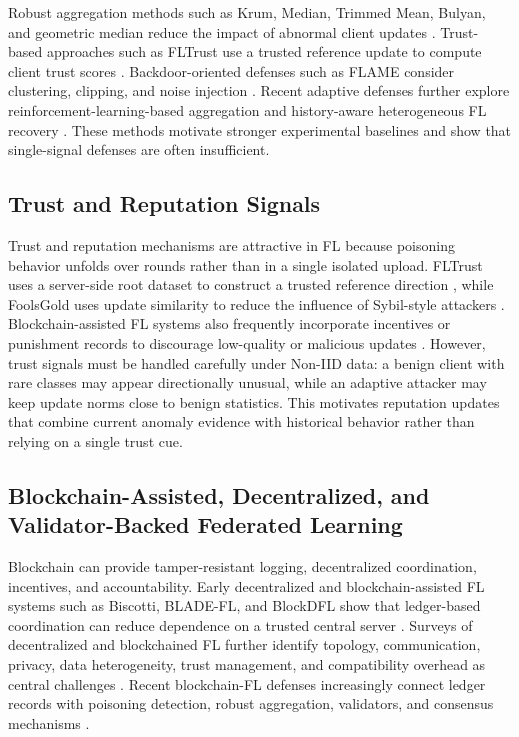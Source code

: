 \documentclass[preprint,authoryear,12pt]{elsarticle}
\begin{document}
Robust aggregation methods such as Krum, Median, Trimmed Mean, Bulyan, and geometric median reduce the impact of abnormal client updates \citep{blanchard2017krum,yin2018byzantine,elmhamdi2018bulyan,pillutla2022rfa}. Trust-based approaches such as FLTrust use a trusted reference update to compute client trust scores \citep{cao2021fltrust}. Backdoor-oriented defenses such as FLAME consider clustering, clipping, and noise injection \citep{nguyen2022flame}. Recent adaptive defenses further explore reinforcement-learning-based aggregation and history-aware heterogeneous FL recovery \citep{wang2025adaaggrl,wang2025fedhan}. These methods motivate stronger experimental baselines and show that single-signal defenses are often insufficient.

\subsection{Trust and Reputation Signals}

Trust and reputation mechanisms are attractive in FL because poisoning behavior unfolds over rounds rather than in a single isolated upload. FLTrust uses a server-side root dataset to construct a trusted reference direction \citep{cao2021fltrust}, while FoolsGold uses update similarity to reduce the influence of Sybil-style attackers \citep{fung2020foolsgold}. Blockchain-assisted FL systems also frequently incorporate incentives or punishment records to discourage low-quality or malicious updates \citep{lu2020blockchain,zhang2024bitfl,ren2024bpfl}. However, trust signals must be handled carefully under Non-IID data: a benign client with rare classes may appear directionally unusual, while an adaptive attacker may keep update norms close to benign statistics. This motivates reputation updates that combine current anomaly evidence with historical behavior rather than relying on a single trust cue.

\subsection{Blockchain-Assisted, Decentralized, and Validator-Backed Federated Learning}

Blockchain can provide tamper-resistant logging, decentralized coordination, incentives, and accountability. Early decentralized and blockchain-assisted FL systems such as Biscotti, BLADE-FL, and BlockDFL show that ledger-based coordination can reduce dependence on a trusted central server \citep{shayan2018biscotti,li2021bladefl,qin2022blockdfl}. Surveys of decentralized and blockchained FL further identify topology, communication, privacy, data heterogeneity, trust management, and compatibility overhead as central challenges \citep{yuan2024dflsurvey,jiang2023blockflsurvey,hallaji2024dflsecurity}. Recent blockchain-FL defenses increasingly connect ledger records with poisoning detection, robust aggregation, validators, and consensus mechanisms \citep{dong2024blockchain,garcia2025kfc,carney2025fidelis,bouchiha2026abc}.
\end{document}
